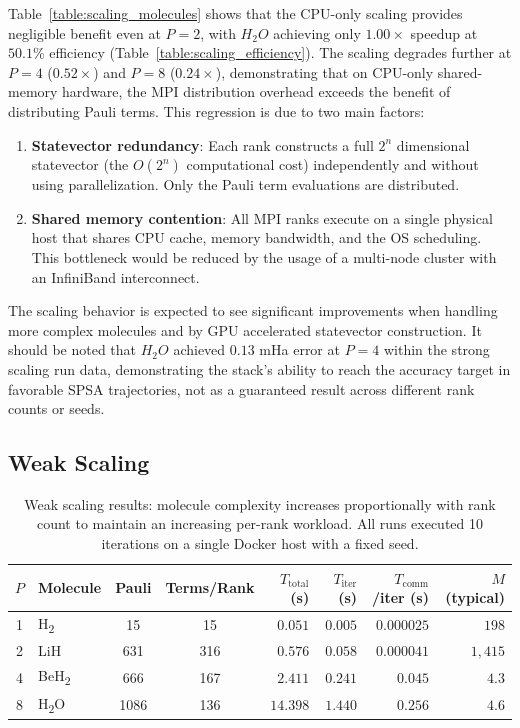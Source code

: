 Table~\ref{table:scaling_molecules} shows that the CPU-only scaling provides negligible benefit even at $P=2$, with $H_{2}O$ achieving only $1.00\times$ speedup at $50.1\%$ efficiency (Table~\ref{table:scaling_efficiency}). The scaling degrades further at $P=4$ ($0.52\times$) and $P=8$ ($0.24\times$), demonstrating that on CPU-only shared-memory hardware, the MPI distribution overhead exceeds the benefit of distributing Pauli terms. This regression is due to two main factors:   
\begin{enumerate}
    \item \textbf{Statevector redundancy}: Each rank constructs a full $2^{n}$ dimensional statevector (the $O(2^n)$ computational cost) independently and without using parallelization. Only the Pauli term evaluations are distributed.
    \item \textbf{Shared memory contention}: All MPI ranks execute on a single physical host that shares CPU cache, memory bandwidth, and the OS scheduling. This bottleneck would be reduced by the usage of a multi-node cluster with an InfiniBand interconnect.          
\end{enumerate}

The scaling behavior is expected to see significant improvements when handling more complex molecules and by GPU accelerated statevector construction. It should be noted that $H_{2}O$ achieved $0.13$ mHa error at $P=4$ within the strong scaling run data, demonstrating the stack's ability to 
reach the accuracy target in favorable SPSA trajectories, not as a guaranteed result across different rank counts or seeds. 

\subsection{Weak Scaling}
\label{sec:results_weak_scaling}
\begin{table}[htbp]
\centering
\renewcommand{\arraystretch}{1.2}
\caption{Weak scaling results: molecule complexity increases proportionally with rank count to maintain an increasing per-rank workload. All runs executed 10 iterations on a single Docker host with a fixed seed.}
\label{table:weak_scaling}
\begin{tabular}{|c|l|c|c|r|r|r|r|}
\hline
\textbf{$P$} & \textbf{Molecule} & \textbf{Pauli} & \textbf{Terms/Rank} & \textbf{$T_{\text{total}}$ (s)} & \textbf{$T_{\text{iter}}$ (s)} & \textbf{$T_{\text{comm}}$/iter (s)} & \textbf{$M$ (typical)} \\ \hline
1 & H\textsubscript{2} & 15 & 15 & $0.051$  & $0.005$ & $0.000025$ & $198$   \\ \hline
2 & LiH  & 631   & 316 & $0.576$ & $0.058$ & $0.000041$ & $1{,}415$ \\ \hline
4 & BeH\textsubscript{2} & 666 & 167 & $2.411$  & $0.241$ & $0.045$  & $4.3$   \\ \hline
8 & H\textsubscript{2}O & 1086 & 136 & $14.398$ & $1.440$ & $0.256$ & $4.6$   \\ \hline
\end{tabular}
\end{table}

